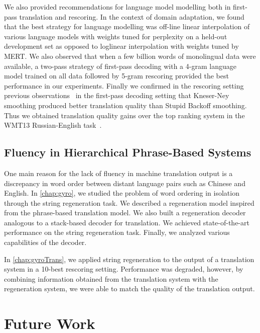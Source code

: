 We also provided recommendations for language model modelling both
in first-pass translation and rescoring. In the context of
domain adaptation, we found that the best strategy for language modelling
was off-line linear interpolation of various language models with
weights tuned for perplexity on a held-out development set as opposed
to loglinear interpolation with weights tuned by MERT.
We also observed that when a few billion words of monolingual data were
available, a two-pass strategy of first-pass decoding with a 4-gram
language model trained on all data followed by 5-gram rescoring
provided the best performance in our experiments.
Finally we confirmed in the rescoring setting previous
observations~\citep{brants-popat-xu-och-dean:2007:EMNLP-CoNLL} in
the first-pass decoding setting
that Kneser-Ney smoothing produced better translation quality than
Stupid Backoff smoothing. Thus we obtained translation quality gains
over the top ranking system in the WMT13 Russian-English
task~\citep{pino-waite-xiao-degispert-flego-byrne:2013:WMT}.

\subsection{Fluency in Hierarchical Phrase-Based Systems}

One main reason for the lack of fluency in machine translation
output is a discrepancy in word order between distant language pairs
such as Chinese and English. In \autoref{chap:gyro}, we
studied the problem of word ordering in isolation through
the string regeneration task. We described a regeneration
model inspired from the phrase-based translation model. We also
built a regeneration decoder
analogous to a stack-based decoder for translation.
We achieved state-of-the-art performance on the string regeneration
task. Finally, we analyzed various capabilities of the decoder.

In \autoref{chap:gyroTrans}, we applied string regeneration
to the output of a translation system in a 10-best rescoring setting.
Performance was degraded, however, by combining information obtained
from the translation system with the regeneration system, we were
able to match the quality of the translation output.

\section{Future Work}
\label{sec:thesisFutureWork}


